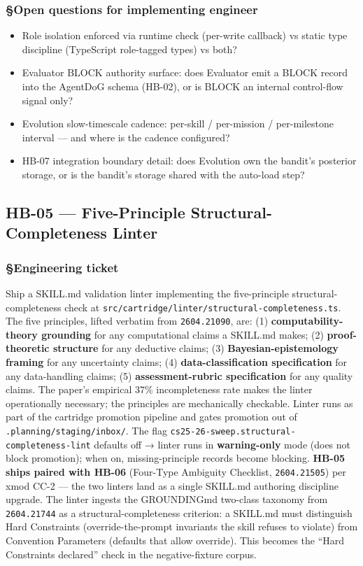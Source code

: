 \documentclass[11pt,letterpaper]{article}
\newcommand{\arxivid}[1]{\texttt{\textcolor{accent}{#1}}}
\providecommand{\tightlist}{\setlength{\itemsep}{0pt}\setlength{\parskip}{0pt}}
\begin{document}
\subsubsection{§Open questions for implementing
engineer}

\begin{itemize}
\tightlist
\item
  Role isolation enforced via runtime check (per-write callback) vs
  static type discipline (TypeScript role-tagged types) vs both?
\item
  Evaluator BLOCK authority surface: does Evaluator emit a BLOCK record
  into the AgentDoG schema (HB-02), or is BLOCK an internal control-flow
  signal only?
\item
  Evolution slow-timescale cadence: per-skill / per-mission /
  per-milestone interval --- and where is the cadence configured?
\item
  HB-07 integration boundary detail: does Evolution own the bandit's
  posterior storage, or is the bandit's storage shared with the
  auto-load step?
\end{itemize}


\subsection{HB-05 — Five-Principle Structural-Completeness Linter}
\subsubsection{§Engineering ticket}

Ship a SKILL.md validation linter implementing the five-principle
structural-completeness check at
\texttt{src/cartridge/linter/structural-completeness.ts}. The five
principles, lifted verbatim from \arxivid{2604.21090}, are: (1)
\textbf{computability-theory grounding} for any computational claims a
SKILL.md makes; (2) \textbf{proof-theoretic structure} for any deductive
claims; (3) \textbf{Bayesian-epistemology framing} for any uncertainty
claims; (4) \textbf{data-classification specification} for any
data-handling claims; (5) \textbf{assessment-rubric specification} for
any quality claims. The paper's empirical 37\% incompleteness rate makes
the linter operationally necessary; the principles are mechanically
checkable. Linter runs as part of the cartridge promotion pipeline and
gates promotion out of \texttt{.planning/staging/inbox/}. The flag
\texttt{cs25-26-sweep.structural-completeness-lint} defaults off →
linter runs in \textbf{warning-only} mode (does not block promotion);
when on, missing-principle records become blocking. \textbf{HB-05 ships
paired with HB-06} (Four-Type Ambiguity Checklist, \arxivid{2604.21505})
per xmod CC-2 --- the two linters land as a single SKILL.md authoring
discipline upgrade. The linter ingests the GROUNDINGmd two-class
taxonomy from \arxivid{2604.21744} as a structural-completeness
criterion: a SKILL.md must distinguish Hard Constraints
(override-the-prompt invariants the skill refuses to violate) from
Convention Parameters (defaults that allow override). This becomes the
``Hard Constraints declared'' check in the negative-fixture corpus.
\end{document}
